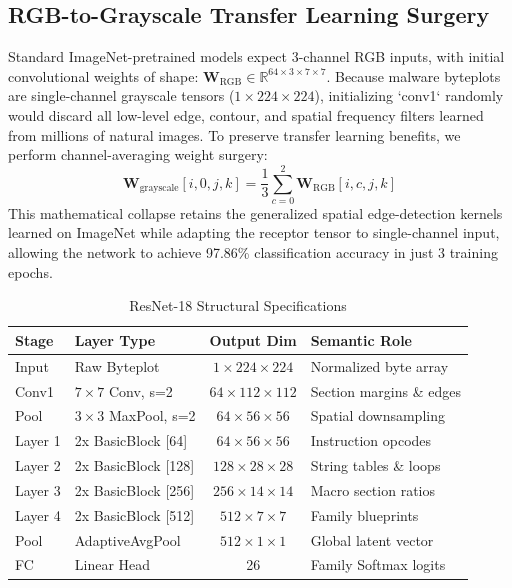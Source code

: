 \documentclass[journal,10pt,twocolumn]{IEEEtran}
\begin{document}
\subsection{RGB-to-Grayscale Transfer Learning Surgery}
Standard ImageNet-pretrained models expect 3-channel RGB inputs, with initial convolutional weights of shape: $\mathbf{W}_{\text{RGB}} \in \mathbb{R}^{64 \times 3 \times 7 \times 7}$. Because malware byteplots are single-channel grayscale tensors ($1 \times 224 \times 224$), initializing `conv1` randomly would discard all low-level edge, contour, and spatial frequency filters learned from millions of natural images. To preserve transfer learning benefits, we perform channel-averaging weight surgery:
\begin{equation}
\mathbf{W}_{\text{grayscale}}[i, 0, j, k] = \frac{1}{3} \sum_{c=0}^{2} \mathbf{W}_{\text{RGB}}[i, c, j, k]
\end{equation}
This mathematical collapse retains the generalized spatial edge-detection kernels learned on ImageNet while adapting the receptor tensor to single-channel input, allowing the network to achieve 97.86\% classification accuracy in just 3 training epochs.

\begin{table}[!t]
\caption{ResNet-18 Structural Specifications\label{tab:resnet}}
\centering
\begin{tabular}{llcl}
\toprule
\textbf{Stage} & \textbf{Layer Type} & \textbf{Output Dim} & \textbf{Semantic Role} \\
\midrule
Input & Raw Byteplot & $1 \times 224 \times 224$ & Normalized byte array \\
Conv1 & $7 \times 7$ Conv, s=2 & $64 \times 112 \times 112$ & Section margins \& edges \\
Pool & $3 \times 3$ MaxPool, s=2 & $64 \times 56 \times 56$ & Spatial downsampling \\
Layer 1 & 2x BasicBlock [64] & $64 \times 56 \times 56$ & Instruction opcodes \\
Layer 2 & 2x BasicBlock [128] & $128 \times 28 \times 28$ & String tables \& loops \\
Layer 3 & 2x BasicBlock [256] & $256 \times 14 \times 14$ & Macro section ratios \\
Layer 4 & 2x BasicBlock [512] & $512 \times 7 \times 7$ & Family blueprints \\
Pool & AdaptiveAvgPool & $512 \times 1 \times 1$ & Global latent vector \\
FC & Linear Head & 26 & Family Softmax logits \\
\bottomrule
\end{tabular}
\end{table}
\end{document}
